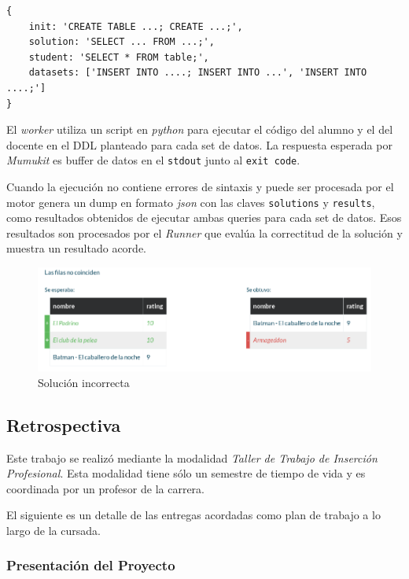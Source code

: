 \begin{lstlisting}
{
    init: 'CREATE TABLE ...; CREATE ...;',
    solution: 'SELECT ... FROM ...;',
    student: 'SELECT * FROM table;',
    datasets: ['INSERT INTO ....; INSERT INTO ...', 'INSERT INTO ....;']
}
\end{lstlisting}

El \textit{worker} utiliza un script en \textit{python}
para ejecutar el código del alumno y el del docente
en el DDL planteado para cada set de datos.
La respuesta esperada por \textit{Mumukit} es buffer
de datos en el \texttt{stdout} junto al \texttt{exit code}.

Cuando la ejecución no contiene errores de sintaxis
y puede ser procesada por el motor genera un dump en formato \textit{json}
con las claves \texttt{solutions} y \texttt{results},
como resultados obtenidos de ejecutar ambas queries
para cada set de datos. Esos resultados son procesados
por el \textit{Runner} que evalúa la correctitud
de la solución y muestra un resultado acorde.


\begin{figure}[h]
  \centering
  \includegraphics[width=\textwidth]{img/rows-error}
  \caption{Solución incorrecta}
  \label{fig:rows-error}
\end{figure}


\subsection{Retrospectiva}

Este trabajo se realizó mediante la modalidad
\textit{Taller de Trabajo de Inserción Profesional}.
Esta modalidad tiene sólo un semestre de tiempo de vida
y es coordinada por un profesor de la carrera.

El siguiente es un detalle de las entregas acordadas
como plan de trabajo a lo largo de la cursada.

\subsubsection{Presentación del Proyecto}

